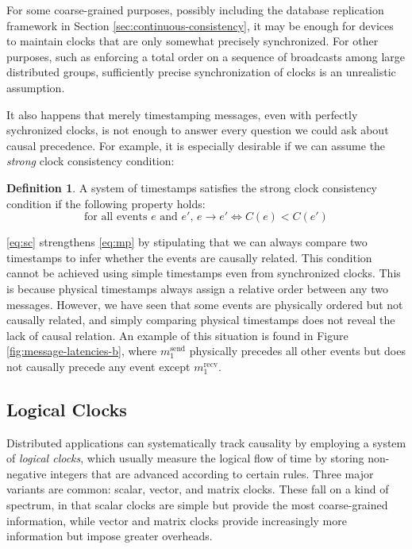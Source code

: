 \documentclass[]             %
{NASA}                       %
\theoremstyle{definition}
\newtheorem{definition}{Definition}[section]
\begin{document}


For some coarse-grained purposes, possibly including the database
replication framework in Section \ref{sec:continuous-consistency}, it
may be enough for devices to maintain clocks that are only somewhat
precisely synchronized. For other purposes, such as enforcing a total
order on a sequence of broadcasts among large distributed groups,
sufficiently precise synchronization of clocks is an unrealistic
assumption.

It also happens that merely timestamping messages, even with perfectly
sychronized clocks, is not enough to answer every question we could
ask about causal precedence. For example, it is especially desirable
if we can assume the \emph{strong} clock consistency condition:
\begin{definition}
  A system of timestamps satisfies the strong clock consistency
  condition if the following property holds:
  \[ \textrm{for all events $e$ and $e'$, } e \to e' \iff C(e) < C(e') \label{eq:sc}\tag{SC} \]
\end{definition}
\ref{eq:sc} strengthens \ref{eq:mp} by stipulating that we can always
compare two timestamps to infer whether the events are causally
related. This condition cannot be achieved using simple timestamps
even from synchronized clocks. This is because physical timestamps
always assign a relative order between any two messages. However, we
have seen that some events are physically ordered but not causally
related, and simply comparing physical timestamps does not reveal the
lack of causal relation. An example of this situation is found in
Figure \ref{fig:message-latencies-b}, where $m_1^\textrm{send}$
physically precedes all other events but does not causally precede any
event except $m_1^\textrm{recv}$.

\subsection{Logical Clocks}
Distributed applications can systematically track causality by
employing a system of \emph{logical clocks}, which usually measure the
logical flow of time by storing non-negative integers that are
advanced according to certain rules. Three major variants are common:
scalar, vector, and matrix clocks. These fall on a kind of spectrum,
in that scalar clocks are simple but provide the most coarse-grained
information, while vector and matrix clocks provide increasingly more
information but impose greater overheads.
\end{document}
